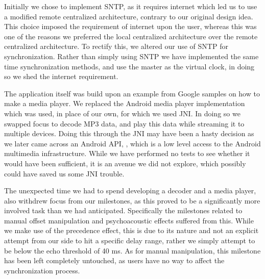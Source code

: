 Initially we chose to implement \ac{SNTP}, as it requires internet which led us to use a modified remote centralized architecture, contrary to our original design idea.
This choice imposed the requirement of internet upon the user, whereas this was one of the reasons we preferred the local centralized architecture over the remote centralized architecture.
To rectify this, we altered our use of \ac{SNTP} for synchronization.
Rather than simply using \ac{SNTP} we have implemented the same time synchronization methods, and use the master as the virtual clock, in doing so we shed the internet requirement.

\bigskip
The application itself was build upon an example from Google samples on how to make a media player.
We replaced the Android media player implementation which was used, in place of our own, for which we used \ac{JNI}.
In doing so we swapped focus to decode MP3 data, and play this data while streaming it to multiple devices.
Doing this through the \ac{JNI} may have been a hasty decision as we later came across an Android API, , which is a low level access to the Android multimedia infrastructure.
While we have performed no tests to see whether it would have been sufficient, it is an avenue we did not explore, which possibly could have saved us some \ac{JNI} trouble.

The unexpected time we had to spend developing a decoder and a media player, also withdrew focus from our milestones, as this proved to be a significantly more involved task than we had anticipated.
Specifically the milestones related to manual offset manipulation and psychoacoustic effects suffered from this.
While we make use of the precedence effect, this is due to its nature and not an explicit attempt from our side to hit a specific delay range, rather we simply attempt to be below the echo threshold of 40 ms.
As for manual manipulation, this milestone has been left completely untouched, as users have no way to affect the synchronization process.


